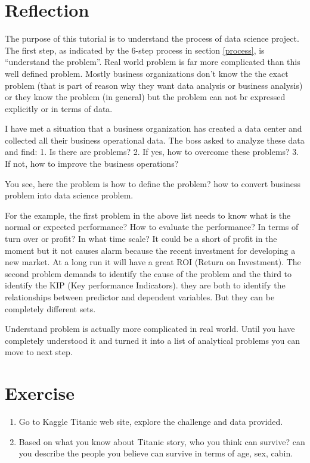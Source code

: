 \documentclass[
]{book}
\providecommand{\tightlist}{%
  \setlength{\itemsep}{0pt}\setlength{\parskip}{0pt}}
\begin{document}
\hypertarget{reflection}{%
\section{Reflection}\label{reflection}}

The purpose of this tutorial is to understand the process of data science project. The first step, as indicated by the 6-step process in section \ref{process}, is ``understand the problem''. Real world problem is far more complicated than this well defined problem. Mostly business organizations don't know the the exact problem (that is part of reason why they want data analysis or business analysis) or they know the problem (in general) but the problem can not br expressed explicitly or in terms of data.

I have met a situation that a business organization has created a data center and collected all their business operational data. The boss asked to analyze these data and find:
1. Is there are problems?
2. If yes, how to overcome these problems?
3. If not, how to improve the business operations?

You see, here the problem is how to define the problem? how to convert business problem into data science problem.

For the example, the first problem in the above list needs to know what is the normal or expected performance? How to evaluate the performance? In terms of turn over or profit? In what time scale? It could be a short of profit in the moment but it not causes alarm because the recent investment for developing a new market. At a long run it will have a great ROI (Return on Investment). The second problem demands to identify the cause of the problem and the third to identify the KIP (Key performance Indicators). they are both to identify the relationships between predictor and dependent variables. But they can be completely different sets.

Understand problem is actually more complicated in real world. Until you have completely understood it and turned it into a list of analytical problems you can move to next step.

\hypertarget{exercise}{%
\section*{Exercise}\label{exercise}}


\begin{enumerate}
\def\labelenumi{\arabic{enumi}.}
\tightlist
\item
  Go to Kaggle Titanic web site, explore the challenge and data provided.
\item
  Based on what you know about Titanic story, who you think can survive? can you describe the people you believe can survive in terms of age, sex, cabin.
\end{enumerate}
\end{document}
